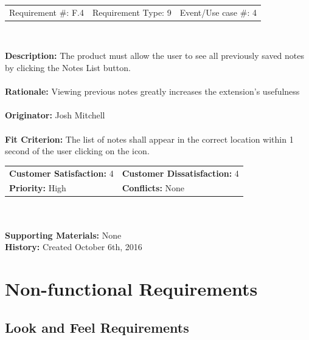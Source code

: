 \documentclass[12pt, titlepage]{article}
\begin{document}
\begin{framed}
	
	\begin{center}
		
		\begin{tabular}{ l c r }
			Requirement \#: F.4 & Requirement Type: 9 & Event/Use case \#: 4\\
		\end{tabular} \\
	\end{center}
	\textbf{Description:} The product must allow the user to see all previously 
	saved notes by clicking the Notes List button.\\
	\\
	\textbf{Rationale:} Viewing previous notes greatly increases the 
	extension's usefulness \\
	\\
	\textbf{Originator:} Josh Mitchell \\
	\\
	\textbf{Fit Criterion:} The list of notes shall appear in the correct 
	location within 1 second of the user clicking on the icon. \\
	
	\begin{tabular}{ll}
		\textbf{Customer Satisfaction:} 4 & \textbf{Customer Dissatisfaction:} 
		4 \\
		\textbf{Priority:} High & \textbf{Conflicts:} None\\
	\end{tabular} \\
	\\
	\textbf{Supporting Materials:} None \\
	\textbf{History:} Created October 6th, 2016
	
\end{framed}
\section{Non-functional Requirements}

\subsection{Look and Feel Requirements}
\end{document}
